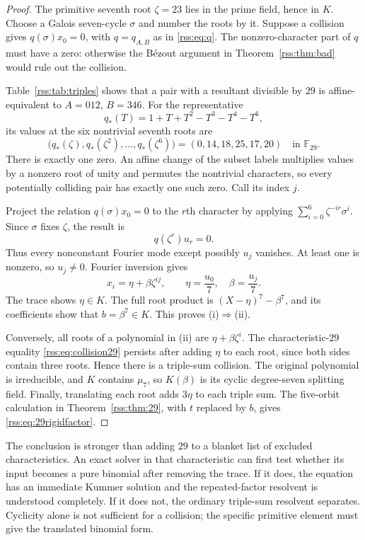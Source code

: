 \documentclass[11pt,a4paper]{article}
\theoremstyle{definition}
\theoremstyle{remark}
\newcommand{\F}{\mathbb F}
\begin{document}
\begin{proof}
The primitive seventh root $\zeta=23$ lies in the prime field, hence in
$K$. Choose a Galois seven-cycle $\sigma$ and number the roots by it.
Suppose a collision gives $q(\sigma)x_0=0$, with
$q=q_{A,B}$ as in \eqref{rss:eq:q}. The nonzero-character part of $q$ must
have a zero: otherwise the B\'ezout argument in
Theorem~\ref{rss:thm:bad} would rule out the collision.

Table~\ref{rss:tab:triples} shows that a pair with a resultant divisible by
$29$ is affine-equivalent to $A=012$, $B=346$. For the representative
\[
 q_*(T)=1+T+T^2-T^3-T^4-T^6,
\]
its values at the six nontrivial seventh roots are
\[
 \bigl(q_*(\zeta),q_*(\zeta^2),\ldots,q_*(\zeta^6)\bigr)
   =(0,14,18,25,17,20)\quad\text{in }\F_{29}.
\]
There is exactly one zero. An affine change of the subset labels
multiplies values by a nonzero root of unity and permutes the nontrivial
characters, so every potentially colliding pair has exactly one such zero.
Call its index $j$.

Project the relation $q(\sigma)x_0=0$ to the $r$th character by applying
$\sum_{i=0}^6\zeta^{-ir}\sigma^i$. Since $\sigma$ fixes $\zeta$, the
result is
\[
 q(\zeta^r)u_r=0.
\]
Thus every nonconstant Fourier mode except possibly $u_j$ vanishes.
At least one is nonzero, so $u_j\neq0$. Fourier inversion gives
\[
 x_i=\eta+\beta\zeta^{ij},\qquad
 \eta=\frac{u_0}{7},\quad\beta=\frac{u_j}{7}.
\]
The trace shows $\eta\in K$. The full root product is
$(X-\eta)^7-\beta^7$, and its coefficients show that
$b=\beta^7\in K$. This proves (i)$\Rightarrow$(ii).

Conversely, all roots of a polynomial in (ii) are
$\eta+\beta\zeta^i$. The characteristic-$29$ equality
\eqref{rss:eq:collision29} persists after adding $\eta$ to each root, since
both sides contain three roots. Hence there is a triple-sum collision.
The original polynomial is irreducible, and $K$ contains $\mu_7$, so
$K(\beta)$ is its cyclic degree-seven splitting field. Finally, translating
each root adds $3\eta$ to each triple sum. The five-orbit calculation in
Theorem~\ref{rss:thm:29}, with $t$ replaced by $b$, gives
\eqref{rss:eq:29rigidfactor}.
\end{proof}

The conclusion is stronger than adding $29$ to a blanket list of excluded
characteristics. An exact solver in that characteristic can first test
whether its input becomes a pure binomial after removing the trace. If it
does, the equation has an immediate Kummer solution and the repeated-factor
resolvent is understood completely. If it does not, the ordinary triple-sum
resolvent separates. Cyclicity alone is not sufficient for a collision;
the specific primitive element must give the translated binomial form.
\end{document}
